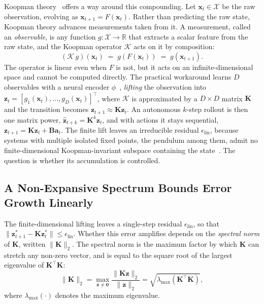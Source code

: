 \documentclass[10pt]{article} %
\newcommand{\K}{\mathbf{K}}
\newcommand{\B}{\mathbf{B}}
\newcommand{\z}{\bm{z}}
\newcommand{\x}{\bm{x}}
\begin{document}
Koopman theory~\citep{Koopman1931,Mezic2005} offers a way around this compounding. Let $\x_t \in \mathcal{X}$ be the raw observation, evolving as $\x_{t+1} = F(\x_t)$. Rather than predicting the raw state, Koopman theory advances measurements taken from it. A measurement, called an \emph{observable}, is any function $g: \mathcal{X} \to \mathbb{R}$ that extracts a scalar feature from the raw state, and the Koopman operator $\mathcal{K}$ acts on it by composition:
\begin{equation}
    (\mathcal{K}\,g)(\x_t) \;=\; g(F(\x_t)) \;=\; g(\x_{t+1}).
    \label{eq:koopman_def}
\end{equation}
The operator is linear even when $F$ is not, but it acts on an infinite-dimensional space and cannot be computed directly. The practical workaround learns $D$ observables with a neural encoder $\phi$~\citep{Lusch2018,Bevanda2021}, \emph{lifting} the observation into $\z_t = [g_1(\x_t), \dots, g_D(\x_t)]^\top$, where $\mathcal{K}$ is approximated by a $D \times D$ matrix $\K$ and the transition becomes $\z_{t+1} \approx \K\z_t$. An autonomous $k$-step rollout is then one matrix power, $\hat{\z}_{t+k} = \K^k\z_t$, and with actions it stays sequential, $\z_{t+1} = \K\z_t + \B\mathbf{a}_t$. The finite lift leaves an irreducible residual $\epsilon_\text{lin}$, because systems with multiple isolated fixed points, the pendulum among them, admit no finite-dimensional Koopman-invariant subspace containing the state~\citep{Brunton2016Invariant}. The question is whether its accumulation is controlled.

\subsection{A Non-Expansive Spectrum Bounds Error Growth Linearly}
\label{sec:bound}
The finite-dimensional lifting leaves a single-step residual $\epsilon_\text{lin}$, so that $\|\z^*_{t+1} - \K\z^*_t\| \le \epsilon_\text{lin}$. Whether this error amplifies depends on the \emph{spectral norm} of $\K$, written $\|\K\|_2$. The spectral norm is the maximum factor by which $\K$ can stretch any non-zero vector, and is equal to the square root of the largest eigenvalue of $\mathbf{K}^\top\mathbf{K}$:
\begin{equation}
    \|\mathbf{K}\|_2 = \max_{\mathbf{z}\neq\mathbf{0}} \frac{\|\mathbf{K}\mathbf{z}\|_2}{\|\mathbf{z}\|_2} = \sqrt{\lambda_{\max}(\mathbf{K}^\top\mathbf{K})},
\end{equation}
where $\lambda_{\max}(\cdot)$ denotes the maximum eigenvalue.
\end{document}
